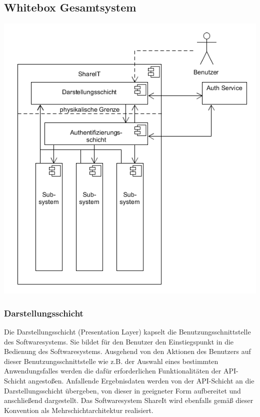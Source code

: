 \documentclass[]{report}
\begin{document}
\subsection{Whitebox Gesamtsystem}\label{_whitebox_gesamtsystem}
\begin{center}
\includegraphics{images/Bausteinsicht E1.png}
\end{center}

\subsubsection{Darstellungsschicht}
 Die Darstellungsschicht (Presentation Layer) kapselt die Benutzungsschnittstelle des Softwaresystems. Sie bildet für den Benutzer den Einstiegspunkt in die Bedienung des Softwaresystems. Ausgehend von den Aktionen des Benutzers auf dieser Benutzungsschnittstelle wie z.B. der Auswahl eines bestimmten Anwendungsfalles werden die dafür erforderlichen Funktionalitäten der API-Schicht angestoßen. Anfallende Ergebnisdaten werden von der API-Schicht an die Darstellungsschicht übergeben, von dieser in geeigneter Form aufbereitet und anschließend dargestellt. Das Softwaresystem ShareIt wird ebenfalls gemäß dieser Konvention als Mehrschichtarchitektur realisiert.
\end{document}
